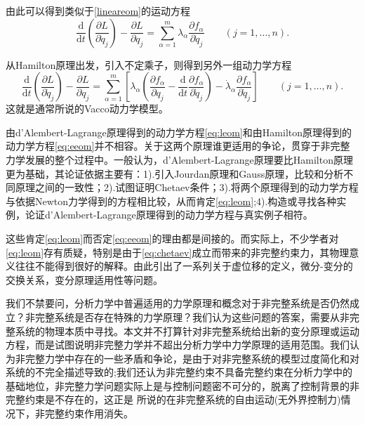 \documentclass{ctexart}
\newcommand{\mathd}{\mathrm{d}}
\begin{document}
由此可以得到类似于\eqref{lineareom}的运动方程
\begin{equation}
  \label{eq:leom}
    \frac{\mathd}{\mathd t} \left( \frac{\partial L}{\partial \dot{q}_j}
   \right) - \frac{\partial L}{\partial q_j} = \sum_{\alpha = 1}^m \lambda_\alpha \frac{\partial f_\alpha}{\partial \dot{q}_j} \hspace{2em} ( j = 1, \ldots, n) .
\end{equation}

从Hamilton原理出发，引入不定乘子，则得到另外一组动力学方程
\begin{equation}
  \label{eq:eeom}
    \frac{\mathd}{\mathd t} \left( \frac{\partial L}{\partial \dot{q}_j}
   \right) - \frac{\partial L}{\partial q_j} = \sum_{\alpha = 1}^m\left[ \lambda_\alpha \left(\frac{\partial f_\alpha}{\partial q_j}-\frac{\mathd}{\mathd t} \frac{\partial f_\alpha}{\partial \dot{q}_j}\right)-\dot{\lambda}_\alpha \frac{\partial f_\alpha}{\partial \dot{q}_j}\right] \hspace{2em} ( j = 1, \ldots, n) .
\end{equation}
这就是通常所说的Vacco动力学模型。


由d'Alembert-Lagrange原理得到的动力学方程\eqref{eq:leom}和由Hamilton原理得到的动力学方程\eqref{eq:eeom}并不相容。关于这两个原理谁更适用的争论，贯穿于非完整力学发展的整个过程中。一般认为，d'Alembert-Lagrange原理要比Hamilton原理更为基础，其论证依据主要有：1).引入Jourdan原理和Gauss原理，比较和分析不同原理之间的一致性；2).试图证明Chetaev条件；3).将两个原理得到的动力学方程与依据Newton力学得到的方程相比较，从而肯定\eqref{eq:leom};4).构造或寻找各种实例，论证d'Alembert-Lagrange原理得到的动力学方程与真实例子相符。

这些肯定\eqref{eq:leom}而否定\eqref{eq:eeom}的理由都是间接的。而实际上，不少学者对\eqref{eq:leom}存有质疑，特别是由于\eqref{eq:chetaev}成立而带来的非完整约束力，其物理意义往往不能得到很好的解释。由此引出了一系列关于虚位移的定义，微分-变分的交换关系，变分原理适用性等问题。

我们不禁要问，分析力学中普遍适用的力学原理和概念对于非完整系统是否仍然成立？非完整系统是否存在特殊的力学原理？我们认为这些问题的答案，需要从非完整系统的物理本质中寻找。本文并不打算针对非完整系统给出新的变分原理或运动方程，而是试图说明非完整力学并不超出分析力学中力学原理的适用范围。我们认为非完整力学中存在的一些矛盾和争论，是由于对非完整系统的模型过度简化和对系统的不完全描述导致的;我们还认为非完整约束不具备完整约束在分析力学中的基础地位，非完整力学问题实际上是与控制问题密不可分的，脱离了控制背景的非完整约束是不存在的，这正是 所说的在非完整系统的自由运动(无外界控制力)情况下，非完整约束作用消失。
\end{document}
